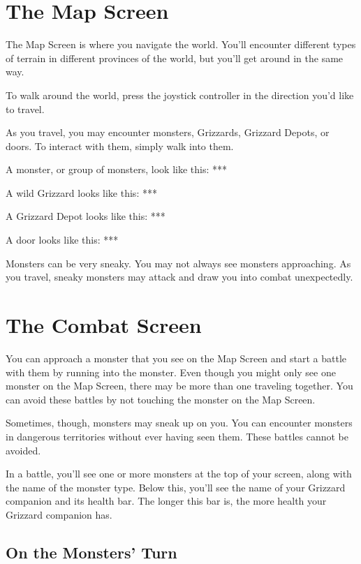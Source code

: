 \documentclass[12pt,twoside,openright,book]{memoir}
\begin{document}
\section{The Map Screen}

The Map Screen is where you navigate the world.  You'll encounter different
types of terrain in different provinces of the world, but you'll get around
in the same way.

To walk around the world, press the joystick controller in the direction
you'd like to travel.

As you travel,  you may encounter monsters,  Grizzards, Grizzard Depots,
or doors. To interact with them, simply walk into them.

A monster, or group of monsters, look like this: ***

A wild Grizzard looks like this: ***

A Grizzard Depot looks like this: ***

A door looks like this: ***

Monsters  can  be   very  sneaky.  You  may  not   always  see  monsters
approaching. As you travel, sneaky monsters may attack and draw you into
combat unexpectedly.

\section{The Combat Screen}

You can approach a monster that you see on the Map Screen and start a
battle with them by running into the monster. Even though you might
only see one monster on the Map Screen, there may be more than one
traveling together. You can avoid these battles by not touching the
monster on the Map Screen.

Sometimes,  though, monsters  may sneak  up  on you.  You can  encounter
monsters  in  dangerous  territories  without  ever  having  seen  them.
These battles cannot be avoided.

In a battle, you'll see one or  more monsters at the top of your screen,
along with the name of the monster type. Below this, you'll see the name
of your Grizzard  companion and its health bar. The  longer this bar is,
the more health your Grizzard companion has.

\subsection{On the Monsters' Turn}
\end{document}

